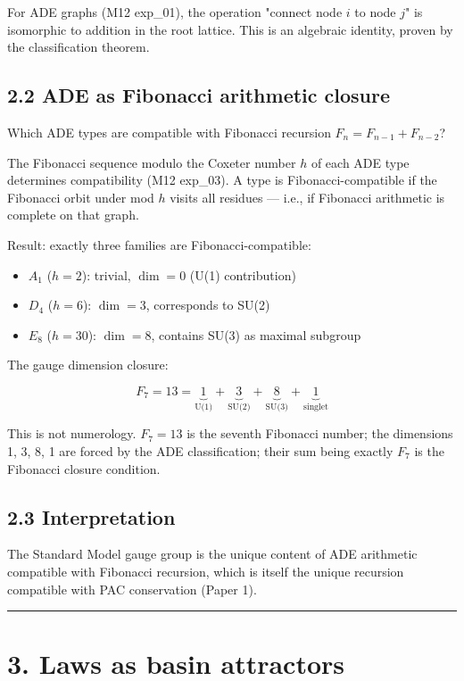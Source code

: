 \documentclass[11pt,a4paper]{article}
\providecommand{\tightlist}{\setlength{\itemsep}{0pt}\setlength{\parskip}{0pt}}
\begin{document}
For ADE graphs (M12 exp\_01), the operation "connect node $i$ to node $j$" is isomorphic to addition in the root lattice. This is an algebraic identity, proven by the classification theorem.

\subsection*{2.2 ADE as Fibonacci arithmetic closure}

Which ADE types are compatible with Fibonacci recursion $F_n = F_{n-1} + F_{n-2}$?

The Fibonacci sequence modulo the Coxeter number $h$ of each ADE type determines compatibility (M12 exp\_03). A type is Fibonacci-compatible if the Fibonacci orbit under mod $h$ visits all residues — i.e., if Fibonacci arithmetic is complete on that graph.

Result: exactly three families are Fibonacci-compatible:
\begin{itemize}\tightlist
\item $A_1$ ($h = 2$): trivial, $\dim = 0$ (U(1) contribution)
\item $D_4$ ($h = 6$): $\dim = 3$, corresponds to SU(2)
\item $E_8$ ($h = 30$): $\dim = 8$, contains SU(3) as maximal subgroup
\end{itemize}

The gauge dimension closure:

\[F_7 = 13 = \underbrace{1}_{\text{U(1)}} + \underbrace{3}_{\text{SU(2)}} + \underbrace{8}_{\text{SU(3)}} + \underbrace{1}_{\text{singlet}}\]

This is not numerology. $F_7 = 13$ is the seventh Fibonacci number; the dimensions 1, 3, 8, 1 are forced by the ADE classification; their sum being exactly $F_7$ is the Fibonacci closure condition.

\subsection*{2.3 Interpretation}

The Standard Model gauge group is the unique content of ADE arithmetic compatible with Fibonacci recursion, which is itself the unique recursion compatible with PAC conservation (Paper 1).

\begin{center}\rule{0.5\linewidth}{0.4pt}\end{center}

\section*{3. Laws as basin attractors}
\end{document}
